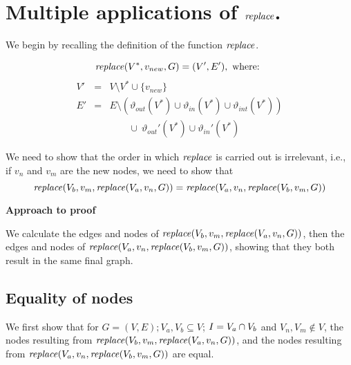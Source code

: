 \section{Multiple applications of $\mathit{replace}$.}
\label{app:multiple}

We begin by recalling the definition of the function $\mathit{replace}$.
\begin{definition}[replace]
\label{def:group-replace}

\[ \mathit{replace} (V^*, v_{new}, G) = (V', E'), \mbox{ where: } \]
\begin{eqnarray*}
V' & = & V  \setminus V^*  \cup \{v_{new}\}\\
E' & = & E  \setminus (\vartheta_{out}(V^*) \cup \vartheta_{in}(V^*) \cup \vartheta_{int}(V^*))  \\
   & & \qquad \cup\  \vartheta_{out}'(V^*)  \cup \vartheta_{in}'(V^*)
\end{eqnarray*}
\end{definition}


We need to show that the order in which $\mathit{replace}$ is carried out is irrelevant, i.e., if $v_n$ and $v_m$ are the new nodes, we need to show that
\[
\mathit{replace}(V_b,v_m,\mathit{replace}(V_a,v_n,G)) = \mathit{replace}(V_a,v_n,\mathit{replace}(V_b,v_m,G))
  \]
  


  

  
\vspace{10pt}
{\bf Approach to proof}
\vspace{10pt}

We  calculate the edges and nodes of
$\mathit{replace}(V_b,v_m,\mathit{replace}(V_a,v_n,G))$, then the edges and nodes of
$\mathit{replace}(V_a,v_n,\mathit{replace}(V_b,v_m,G))$, 
showing that they both result in the same final graph.
%



  
 
\subsection*{Equality of nodes}

We first show that for $ G=(V,E); V_a,V_b \subseteq V$; $I=V_a\cap V_b$  and $V_n,V_m \nin V$, the nodes resulting from 
$\mathit{replace}(V_b,v_m,\mathit{replace}(V_a,v_n,G))$, and the nodes resulting from 
$\mathit{replace}(V_a,v_n,\mathit{replace}(V_b,v_m,G))$ are equal.

